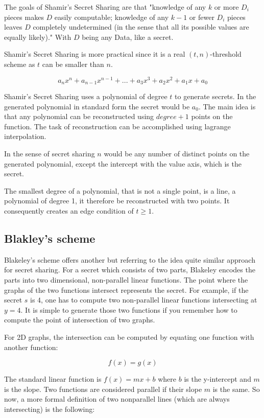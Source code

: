 The goals of Shamir's Secret Sharing are that "knowledge of any $k$ or more
$D_i$ pieces makes $D$ easily computable; knowledge of any $k - 1$ or fewer
$D_i$ pieces leaves $D$ completely undetermined (in the sense that all its
possible values are equally likely)." With $D$ being any Data, like a secret.

Shamir's Secret Sharing is more practical since it is a real $(t, n)$-threshold
scheme as $t$ can be smaller than $n$.

$$a_{n}x^n + a_{n-1}x^{n-1} + ... + a_{3}x^3 + a_{2}x^2 + a_{1}x + a_0 $$

Shamir's Secret Sharing uses a polynomial of degree $t$ to generate secrets.
In the generated polynomial in standard form the secret would be $a_0$. The
main idea is that any polynomial can be reconstructed using $degree + 1$ points
on the function. The task of reconstruction can be accomplished using lagrange
interpolation.

In the sense of secret sharing $n$ would be any number of distinct points on
the generated polynomial, except the intercept with the value axis, which is
the secret.

The smallest degree of a polynomial, that is not a single point, is a line, a
polynomial of degree 1, it therefore be reconstructed with two points. It
consequently creates an edge condition of $t \geq 1$.

\subsection{Blakley's scheme}

Blakeley's scheme offers another but referring to the idea quite similar
approach for secret sharing. For a secret which consists of two parts, 
Blakeley encodes the parts into two dimensional, non-parallel linear functions.
The point where the graphs of the two functions intersect represents the
secret. For example, if the secret $s$ is $4$, one has to compute two non-parallel
linear functions intersecting at $y = 4$. It is simple to generate those two
functions if you remember how to compute the point of intersection of two graphs.

For 2D graphs, the intersection can be computed by equating one function with
another function:

$$f(x) = g(x)$$

The standard linear function is $f(x) = mx + b$ where $b$ is the y-intercept and
$m$ is the slope. Two functions are considered parallel if their slope $m$ is 
the same. So now, a more formal definition of two nonparallel lines (which are
always intersecting) is the following:

